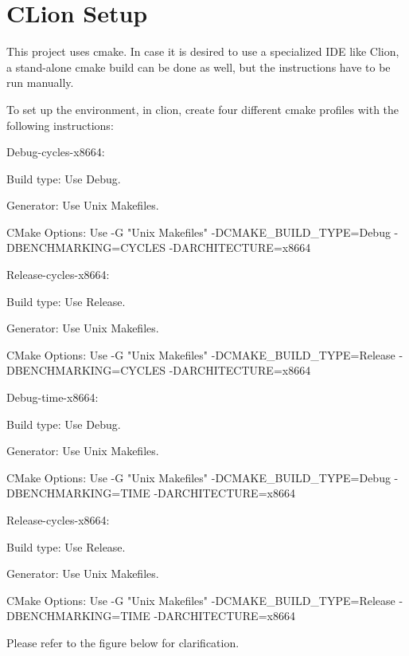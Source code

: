 \chapter{CLion Setup}
\hypertarget{md__2home_2liwuen_2projects__dev_2pqc-engineering-ssec-23_2README__Clion__IDE}{}\label{md__2home_2liwuen_2projects__dev_2pqc-engineering-ssec-23_2README__Clion__IDE}
\label{md__2home_2liwuen_2projects__dev_2pqc-engineering-ssec-23_2README__Clion__IDE_autotoc_md39}%
%
 This project uses {\ttfamily cmake}. In case it is desired to use a specialized IDE like Clion, a stand-\/alone {\ttfamily cmake} build can be done as well, but the instructions have to be run manually.

To set up the environment, in clion, create four different cmake profiles with the following instructions\+:


\begin{DoxyItemize}
\item Debug-\/cycles-\/x8664\+:
\begin{DoxyItemize}
\item Build type\+: Use {\ttfamily Debug}.
\item Generator\+: Use {\ttfamily Unix Makefiles}.
\item CMake Options\+: Use {\ttfamily -\/G "{}\+Unix Makefiles"{} -\/DCMAKE\+\_\+\+BUILD\+\_\+\+TYPE=Debug -\/DBENCHMARKING=CYCLES -\/DARCHITECTURE=x8664}
\end{DoxyItemize}
\item Release-\/cycles-\/x8664\+:
\begin{DoxyItemize}
\item Build type\+: Use {\ttfamily Release}.
\item Generator\+: Use {\ttfamily Unix Makefiles}.
\item CMake Options\+: Use {\ttfamily -\/G "{}\+Unix Makefiles"{} -\/DCMAKE\+\_\+\+BUILD\+\_\+\+TYPE=Release -\/DBENCHMARKING=CYCLES -\/DARCHITECTURE=x8664}
\end{DoxyItemize}
\item Debug-\/time-\/x8664\+:
\begin{DoxyItemize}
\item Build type\+: Use {\ttfamily Debug}.
\item Generator\+: Use {\ttfamily Unix Makefiles}.
\item CMake Options\+: Use {\ttfamily -\/G "{}\+Unix Makefiles"{} -\/DCMAKE\+\_\+\+BUILD\+\_\+\+TYPE=Debug -\/DBENCHMARKING=TIME -\/DARCHITECTURE=x8664}
\end{DoxyItemize}
\item Release-\/cycles-\/x8664\+:
\begin{DoxyItemize}
\item Build type\+: Use {\ttfamily Release}.
\item Generator\+: Use {\ttfamily Unix Makefiles}.
\item CMake Options\+: Use {\ttfamily -\/G "{}\+Unix Makefiles"{} -\/DCMAKE\+\_\+\+BUILD\+\_\+\+TYPE=Release -\/DBENCHMARKING=TIME -\/DARCHITECTURE=x8664}
\end{DoxyItemize}
\end{DoxyItemize}

Please refer to the figure below for clarification.

 
